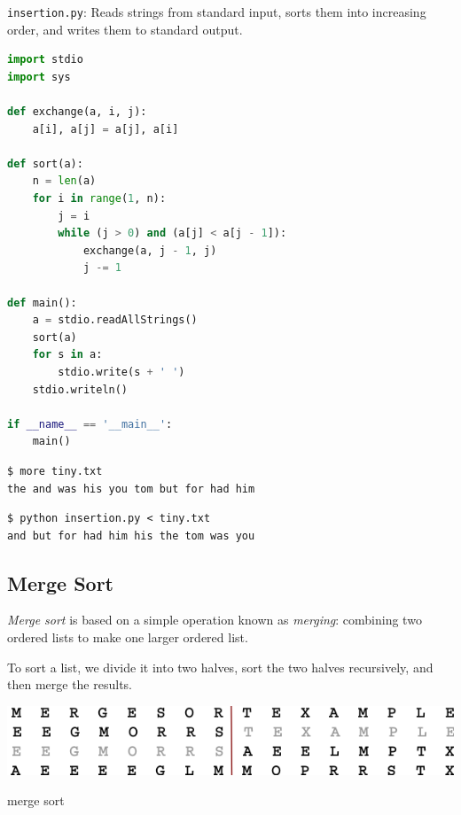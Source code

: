 \documentclass[8pt,a4paper,compress,handout]{beamer}
\begin{document}
\begin{frame}[fragile]
\begin{framed}
\tiny \lstinline{insertion.py}: Reads strings from standard input, sorts them into increasing order, and writes them to standard output.
\end{framed}

\begin{lstlisting}[language=Python]
import stdio
import sys

def exchange(a, i, j):
    a[i], a[j] = a[j], a[i]

def sort(a):
    n = len(a)
    for i in range(1, n):
        j = i
        while (j > 0) and (a[j] < a[j - 1]):
            exchange(a, j - 1, j)
            j -= 1

def main():
    a = stdio.readAllStrings()
    sort(a)
    for s in a:
        stdio.write(s + ' ')
    stdio.writeln()

if __name__ == '__main__':
    main()
\end{lstlisting}

\begin{lstlisting}[language={}]
$ more tiny.txt 
the and was his you tom but for had him
\end{lstlisting}

\begin{lstlisting}[language={}]
$ python insertion.py < tiny.txt 
and but for had him his the tom was you 
\end{lstlisting}
\end{frame}

\subsection*{Merge Sort}
\begin{frame}[fragile]
\emph{Merge sort} is based on a simple operation known as \emph{merging}: combining two ordered lists to make one larger ordered list.

\bigskip

To sort a list, we divide it into two halves, sort the two halves recursively, and then merge the results.

\begin{center}
\includegraphics[scale=0.3]{figures/merge.png}

\smallskip

\tiny merge sort
\end{center}
\end{frame}
\end{document}

